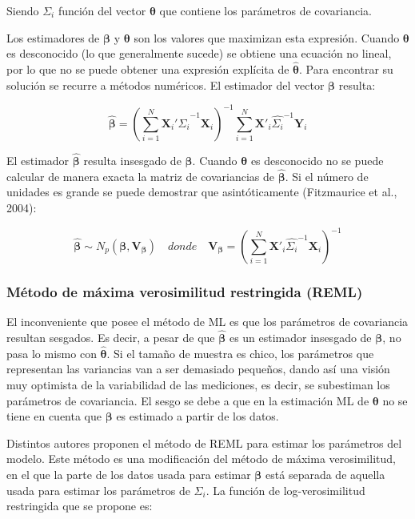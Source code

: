 \documentclass[spanish]{article}
\numberwithin{figure}{subsection}
\numberwithin{equation}{subsection}
\numberwithin{table}{subsection}
\begin{document}
Siendo $\bm{\varSigma}_i$ función del vector $\bm{\theta}$ que contiene los
parámetros de covariancia.

Los estimadores de $\bm{\beta}$ y $\bm{\theta}$ son los valores que maximizan
esta expresión. Cuando $\bm{\theta}$ es desconocido (lo que generalmente sucede)
se obtiene una ecuación no lineal, por lo que no se puede obtener una expresión
explícita de $\hat{\bm{\theta}}$. Para encontrar su solución se recurre a
métodos numéricos. El estimador del vector $\bm{\beta}$ resulta:

\[ \hat{\bm{\beta}} = (\sum_{i=1}^{N} \bm{X}_i'\hat{\bm{\varSigma}_i}^{-1}\bm{X}_i)^{-1}
\sum_{i=1}^{N} \bm{X}'_i\hat{\bm{\varSigma}_i}^{-1}\bm{Y}_i \]

El estimador $\hat{\bm{\beta}}$ resulta insesgado de $\bm{\beta}$. Cuando
$\bm{\theta}$ es desconocido no se puede calcular de manera exacta la matriz
de covariancias de $\hat{\bm{\beta}}$. Si el número de unidades es grande se
puede demostrar que asintóticamente (Fitzmaurice et al., 2004):

\[ \hat{\bm{\beta}} \sim N_p(\bm{\beta}, \bm{V}_{\bm{\beta}}) \quad donde \quad \bm{V}_{\bm{\beta}} =
(\sum_{i=1}^{N} \bm{X}'_i\hat{\bm{\varSigma}_i}^{-1}\bm{X}_i)^{-1} \]

\subsubsection{Método de máxima verosimilitud restringida (REML)}

El inconveniente que posee el método de ML es que los parámetros de covariancia
resultan sesgados. Es decir, a pesar de que $\bm{\hat{\beta}}$ es un estimador
insesgado de $\bm{\beta}$, no pasa lo mismo con $\bm{\hat{\theta}}$. Si el
tamaño de muestra es chico, los parámetros que representan las variancias van a
ser demasiado pequeños, dando así una visión muy optimista de la variabilidad de
las mediciones, es decir, se subestiman los parámetros de covariancia. El sesgo
se debe a que en la estimación ML de $\bm{\theta}$ no se tiene en cuenta que
$\bm{\beta}$ es estimado a partir de los datos.

Distintos autores proponen el método de REML para estimar los parámetros del
modelo. Este método es una modificación del método de máxima verosimilitud, en
el que la parte de los datos usada para estimar $\bm{\beta}$ está separada de
aquella usada para estimar los parámetros de $\bm{\varSigma}_i$. La función de
log-verosimilitud restringida que se propone es:
\end{document}
